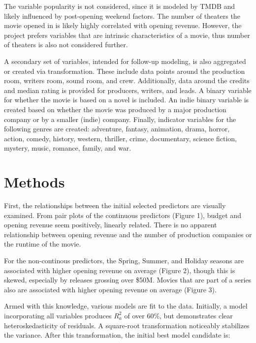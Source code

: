 \documentclass[10pt]{article}
\begin{document}
The variable popularity is not considered, since it is modeled by TMDB and likely influenced by post-opening weekend factors. The number of theaters the movie opened in is likely highly correlated with opening revenue. However, the project prefers variables that are intrinsic characteristics of a movie, thus number of theaters is also not considered further. 

A secondary set of variables, intended for follow-up modeling, is also aggregated or created via transformation. These include data points around the production room, writers room, sound room, and crew. Additionally, data around the credits and median rating is provided for producers, writers, and leads. A binary variable for whether the movie is based on a novel is included. An indie binary variable is created based on whether the movie was produced by a major production company or by a smaller (indie) company. Finally, indicator variables for the following genres are created: adventure, fantasy, animation, drama, horror, action, comedy, history, western, thriller, crime, documentary, science fiction, mystery, music, romance, family, and war.

\section{Methods}
First, the relationships between the initial selected predictors are visually examined. From pair plots of the continuous predictors (Figure 1), budget and opening revenue seem positively, linearly related. There is no apparent relationship between opening revenue and the number of production companies or the runtime of the movie. 

For the non-continous predictors, the Spring, Summer, and Holiday seasons are associated with higher opening revenue on average (Figure 2), though this is skewed, especially by releases grossing over \$50M. Movies that are part of a series also are associated with higher opening revenue on average (Figure 3). 

Armed with this knowledge, various models are fit to the data. Initially, a model incorporating all variables produces $R^2_a$ of over 60\%, but demonstrates clear heteroskedasticity of residuals. A square-root transformation noticeably stabilizes the variance. After this transformation, the initial best model candidate is:
\end{document}
